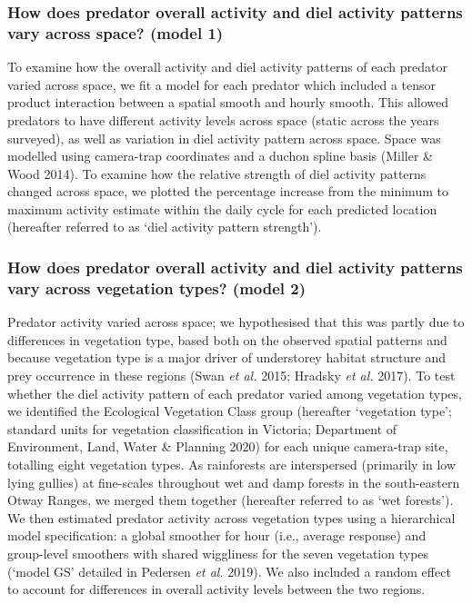 \documentclass[]{elsarticle} %
\begin{document}
\hypertarget{how-does-predator-overall-activity-and-diel-activity-patterns-vary-across-space-model-1}{%
\subsubsection{How does predator overall activity and diel activity patterns vary across space? (model 1)}\label{how-does-predator-overall-activity-and-diel-activity-patterns-vary-across-space-model-1}}

To examine how the overall activity and diel activity patterns of each predator varied across space, we fit a model for each predator which included a tensor product interaction between a spatial smooth and hourly smooth. This allowed predators to have different activity levels across space (static across the years surveyed), as well as variation in diel activity pattern across space. Space was modelled using camera-trap coordinates and a duchon spline basis (Miller \& Wood 2014). To examine how the relative strength of diel activity patterns changed across space, we plotted the percentage increase from the minimum to maximum activity estimate within the daily cycle for each predicted location (hereafter referred to as `diel activity pattern strength').

\hypertarget{how-does-predator-overall-activity-and-diel-activity-patterns-vary-across-vegetation-types-model-2}{%
\subsubsection{How does predator overall activity and diel activity patterns vary across vegetation types? (model 2)}\label{how-does-predator-overall-activity-and-diel-activity-patterns-vary-across-vegetation-types-model-2}}

Predator activity varied across space; we hypothesised that this was partly due to differences in vegetation type, based both on the observed spatial patterns and because vegetation type is a major driver of understorey habitat structure and prey occurrence in these regions (Swan \emph{et al.} 2015; Hradsky \emph{et al.} 2017). To test whether the diel activity pattern of each predator varied among vegetation types, we identified the Ecological Vegetation Class group (hereafter `vegetation type'; standard units for vegetation classification in Victoria; Department of Environment, Land, Water \& Planning 2020) for each unique camera-trap site, totalling eight vegetation types. As rainforests are interspersed (primarily in low lying gullies) at fine-scales throughout wet and damp forests in the south-eastern Otway Ranges, we merged them together (hereafter referred to as `wet forests'). We then estimated predator activity across vegetation types using a hierarchical model specification: a global smoother for hour (i.e., average response) and group-level smoothers with shared wiggliness for the seven vegetation types (`model GS' detailed in Pedersen \emph{et al.} 2019). We also included a random effect to account for differences in overall activity levels between the two regions.
\end{document}
